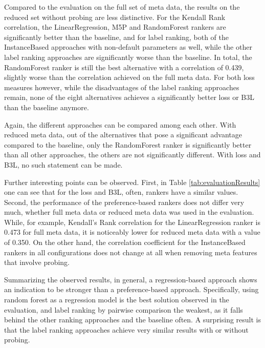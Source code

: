 Compared to the evaluation on the full set of meta data, the results on the reduced set without probing are less distinctive. For the Kendall Rank correlation, the LinearRegression, M5P and RandomForest rankers are significantly better than the baseline, and for label ranking, both of the InstanceBased approaches with non-default parameters as well, while the other label ranking approaches are significantly worse than the baseline. In total, the RandomForest ranker is still the best alternative with a correlation of 0.439, slightly worse than the correlation achieved on the full meta data. For both loss measures however, while the disadvantages of the label ranking approaches remain, none of the eight alternatives achieves a significantly better loss or B3L than the baseline anymore.

Again, the different approaches can be compared among each other. With reduced meta data, out of the alternatives that pose a significant advantage compared to the baseline, only the RandomForest ranker is significantly better than all other approaches, the others are not significantly different. With loss and B3L, no such statement can be made.

Further interesting points can be observed. First, in Table \ref{tab:evaluationResults} one can see that for the loss and B3L, often, rankers have a similar values. Second, the performance of the preference-based rankers does not differ very much, whether full meta data or reduced meta data was used in the evaluation. While, for example, Kendall's Rank correlation for the LinearRegression ranker is 0.473 for full meta data, it is noticeably lower for reduced meta data with a value of 0.350. On the other hand, the correlation coefficient for the InstanceBased rankers in all configurations does not change at all when removing meta features that involve probing.

Summarizing the observed results, in general, a regression-based approach shows an indication to be stronger than a preference-based approach. Specifically, using random forest as a regression model is the best solution observed in the evaluation, and label ranking by pairwise comparison the weakest, as it falls behind the other ranking approaches and the baseline often. A surprising result is that the label ranking approaches achieve very similar results with or without probing.





